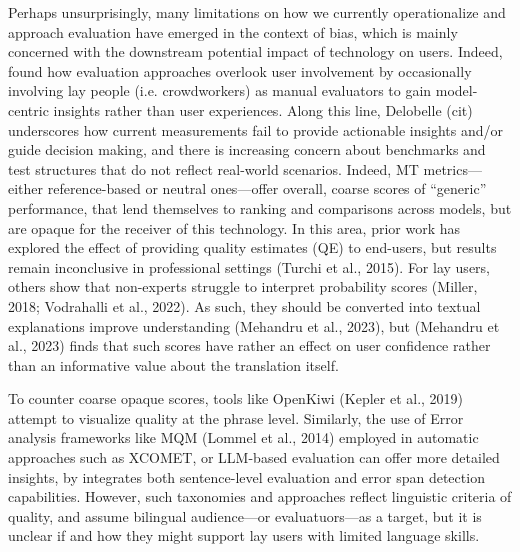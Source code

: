 Perhaps unsurprisingly, many limitations on how we currently operationalize and approach evaluation have emerged in the context of bias, which is mainly concerned with the downstream potential impact of technology on users. Indeed, \citep{Savoldi} found how evaluation approaches overlook user involvement by occasionally involving lay people (i.e. crowdworkers)  as manual evaluators to gain model-centric insights rather than user experiences. Along this line, Delobelle (cit)  underscores how current measurements fail to provide actionable insights and/or guide decision making, and there is increasing concern about benchmarks and test structures that do not reflect real-world scenarios. 
%
Indeed, MT metrics---either reference-based or neutral ones---offer overall, coarse scores of ``generic'' performance, that lend themselves to ranking and comparisons across models, but are opaque for the receiver of this technology. 
%
%
In this area, prior work has explored the effect of providing quality estimates (QE) to end-users, but results remain inconclusive in professional settings (Turchi et al., 2015). For lay users, 
others show that non-experts struggle to interpret probability scores (Miller, 2018; Vodrahalli et al., 2022). As such, they should be converted into textual explanations improve understanding (Mehandru et al., 2023), but (Mehandru et al., 2023) finds that such scores have rather an effect on user confidence rather than an informative value about the translation itself. 
%

To counter coarse opaque scores, tools like OpenKiwi (Kepler et al., 2019) attempt to visualize quality at the phrase level. Similarly, 
the use of Error analysis frameworks like MQM (Lommel et al., 2014) 
employed in automatic approaches such as XCOMET, or LLM-based evaluation can
offer more detailed insights, by integrates both sentence-level evaluation and error span detection capabilities. However, such taxonomies and approaches reflect linguistic criteria of quality, and assume bilingual audience---or evaluatuors---as a target, but it is unclear if and how they might support lay users with limited language skills. 

